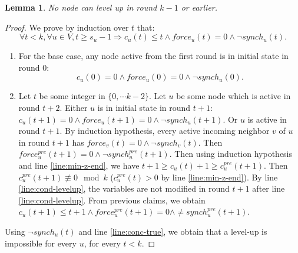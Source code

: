 \documentclass[11pt,letterpaper]{article}
\newtheorem{lem}[thm]{Lemma}
\begin{document}
\begin{lem}
	No node can level up in round $k-1$ or earlier.
\end{lem}
\begin{proof}
	We prove by induction over $t$ that:
	$$\forall t < k, \forall u \in V, t \geq s_u-1 \Rightarrow c_u(t) \leq t \wedge force_u(t) = 0 \wedge \neg synch_u(t).$$
	\begin{enumerate}
		\item For the base case, any node active from the first round is in initial state in round 0:
			$$c_u(0) = 0 \wedge force_u(0) = 0 \wedge \neg synch_u(0).$$
		\item Let $t$ be some integer in $\{0, \cdots k-2\}$. Let $u$ be some node which is active in round $t+2$.
			Either $u$ is in initial state in round $t+1$: $c_u(t+1) = 0 \wedge force_u(t+1) = 0 \wedge \neg synch_u(t+1)$.
			Or $u$ is active in round $t+1$.
			By induction hypothesis, every active incoming neighbor $v$ of $u$ in round $t+1$ has $force_v(t) = 0 \wedge \neg synch_v(t)$.
			Then $force_u^{pre}(t+1) = 0 \wedge \neg synch_u^{pre}(t+1)$.
			Then using induction hypothesis and line \ref{line:min-z-end}, we have
			$t+1 \geq c_u(t)+1 \geq c_u^{pre}(t+1)$.
			Then $c_u^{pre}(t+1) \not\equiv 0 \mod k$ ($c_u^{pre}(t) > 0$ by line \ref{line:min-z-end}).
			By line \ref{line:cond-levelup}, the variables are not modified in round $t+1$ after line \ref{line:cond-levelup}.
			From previous claims, we obtain $c_u(t+1) \leq t+1 \wedge force_u^{pre}(t+1) = 0 \wedge \neq synch_u^{pre}(t+1)$.
	\end{enumerate}
	Using $\neg synch_u(t)$ and line \ref{line:conc-true}, we obtain that a level-up is impossible for every $u$, for every $t < k$.
\end{proof}
\end{document}
